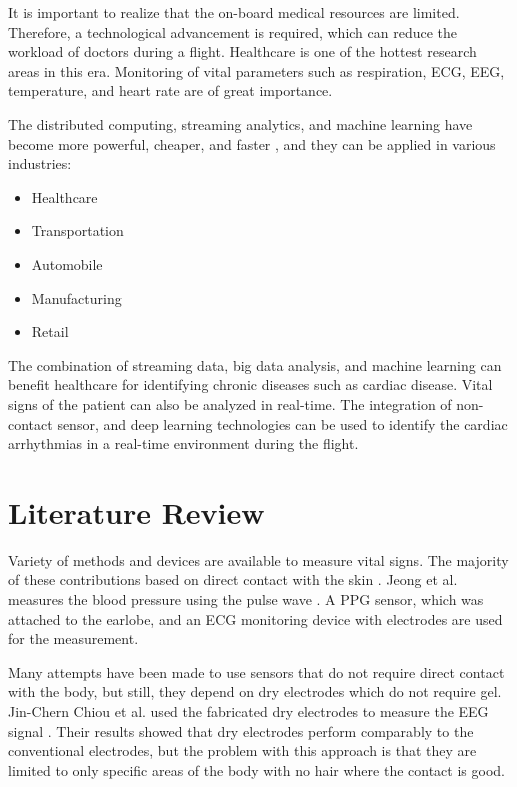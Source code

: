 
It is important to realize that the on-board medical resources are limited. Therefore, a technological advancement is required, which can reduce the workload of doctors during a flight. Healthcare is one of the hottest research areas in this era. Monitoring of vital parameters such as respiration, ECG, EEG, temperature, and heart rate are of great importance.


The distributed computing, streaming analytics, and machine learning have become more powerful, cheaper, and faster \cite{maprmliotmed}, and they can be applied in various industries:

\begin{itemize}
	\item Healthcare
	\item Transportation
	\item Automobile
	\item Manufacturing
	\item Retail
\end{itemize}


The combination of streaming data, big data analysis, and machine learning can benefit healthcare for identifying chronic diseases such as cardiac disease. Vital signs of the patient can also be analyzed in real-time. The integration of non-contact sensor, and deep learning technologies can be used to identify the cardiac arrhythmias in a real-time environment during the flight.

\section{Literature Review}

Variety of methods and devices are available to measure vital signs. The majority of these contributions based on direct contact with the skin \cite{shen2007detection} \cite{neuman1998biopotential}. Jeong et al. measures the blood pressure using the pulse wave \cite{jeong2005continuous}. A PPG sensor, which was attached to the earlobe, and an ECG monitoring device with electrodes are used for the measurement.

Many attempts have been made to use sensors that do not require direct contact with the body, but still, they depend on dry electrodes which do not require gel. Jin-Chern Chiou et al. used the fabricated dry electrodes to measure the EEG signal \cite{4600301}. Their results showed that dry electrodes perform comparably to the conventional electrodes, but the problem with this approach is that they are limited to only specific areas of the body with no hair where the contact is good.


